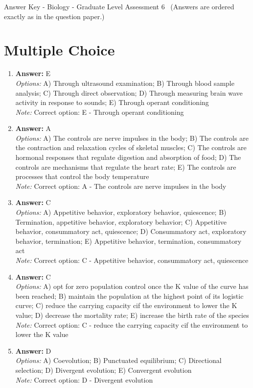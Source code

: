 \documentclass[12pt]{article}
\begin{document}
\begin{center}
Answer Key - Biology - Graduate Level Assessment 6 \
\small (Answers are ordered exactly as in the question paper.)
\end{center}

\section*{Multiple Choice}
\begin{enumerate}[label=\arabic*.]
\item \textbf{Answer:} E
\\ \textit{Options:} A) Through ultrasound examination; B) Through blood sample analysis; C) Through direct observation; D) Through measuring brain wave activity in response to sounds; E) Through operant conditioning
\\ \textit{Note:} Correct option: E - Through operant conditioning
\item \textbf{Answer:} A
\\ \textit{Options:} A) The controls are nerve impulses in the body; B) The controls are the contraction and relaxation cycles of skeletal muscles; C) The controls are hormonal responses that regulate digestion and absorption of food; D) The controls are mechanisms that regulate the heart rate; E) The controls are processes that control the body temperature
\\ \textit{Note:} Correct option: A - The controls are nerve impulses in the body
\item \textbf{Answer:} C
\\ \textit{Options:} A) Appetitive behavior, exploratory behavior, quiescence; B) Termination, appetitive behavior, exploratory behavior; C) Appetitive behavior, consummatory act, quiescence; D) Consummatory act, exploratory behavior, termination; E) Appetitive behavior, termination, consummatory act
\\ \textit{Note:} Correct option: C - Appetitive behavior, consummatory act, quiescence
\item \textbf{Answer:} C
\\ \textit{Options:} A) opt for zero population control once the K value of the curve has been reached; B) maintain the population at the highest point of its logistic curve; C) reduce the carrying capacity cif the environment to lower the K value; D) decrease the mortality rate; E) increase the birth rate of the species
\\ \textit{Note:} Correct option: C - reduce the carrying capacity cif the environment to lower the K value
\item \textbf{Answer:} D
\\ \textit{Options:} A) Coevolution; B) Punctuated equilibrium; C) Directional selection; D) Divergent evolution; E) Convergent evolution
\\ \textit{Note:} Correct option: D - Divergent evolution
\end{enumerate}
\end{document}
